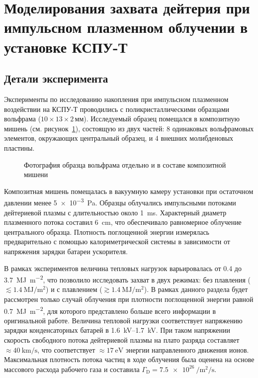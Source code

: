 
\section{Моделирования захвата дейтерия при импульсном плазменном облучении в установке КСПУ-Т}\label{sec:ch3/sec1}
\subsection{Детали эксперимента}\label{sec:ch3/sec1/subsec1}
Эксперименты по исследованию накопления при импульсном плазменном воздействии на КСПУ-Т проводились с поликристаллическими образцами вольфрама ($10\times13\times2$\,мм). Исследуемый образец помещался в композитную мишень (см. рисунок~\cref{fig:ch3/QSPA_target}), состоящую из двух частей: 8 одинаковых вольфрамовых элементов, окружающих центральный образец, и 4 внешних молибденовых пластины.
\begin{figure}[ht]
	\caption{Фотография образца вольфрама отдельно и в составе композитной мишени~\cite{Poskakalov2020}}\label{fig:ch3/QSPA_target}
\end{figure}
Композитная мишень помещалась в вакуумную камеру установки при остаточном давлении менее \SI{5e-3}{\pascal}. Образцы облучались импульсными потоками дейтериевой плазмы с длительностью около \SI{1}{\milli\second}. Характерный диаметр плазменного потока составил \SI{6}{\centi\meter}, что обеспечивало равномерное облучение центрального образца. Плотность поглощенной энергии измерялась предварительно с помощью калориметрической системы в зависимости от напряжения зарядки батареи ускорителя. 

В рамках экспериментов величина тепловых нагрузок варьировалась от \num{0.4} до \SI{3.7}{\mega\joule\per\meter\squared}, что позволило исследовать захват в двух режимах: без плавления (\( \lesssim \SI{1.4}{\mega\joule\per\meter\squared} \)) и с плавлением (\( \gtrsim \SI{1.4}{\mega\joule\per\meter\squared} \)). В рамках данного раздела будет рассмотрен только случай облучения при плотности поглощенной энергии равной \SI{0.7}{\mega\joule\per\meter\squared}, для которого представлено больше всего информации в оригинальной работе. Величина тепловой нагрузки соответствует напряжению зарядки конденсаторных батарей в \SIrange{1.6}{1.7}{\kilo\volt}. При таком напряжении скорость свободного потока дейтериевой плазмы на плато разряда составляет \(\approx \SI{40}{\kilo\meter\per\second} \), что соответствует \(\approx \SI{17}{\electronvolt} \) энергии направленного движения ионов. Максимальная плотность потока частиц в ходе облучения была оценена на основе массового расхода рабочего газа и составила \( \Gamma_\mathrm{D}=\SI{7.5e26}{\per\meter\squared\per\second} \).

